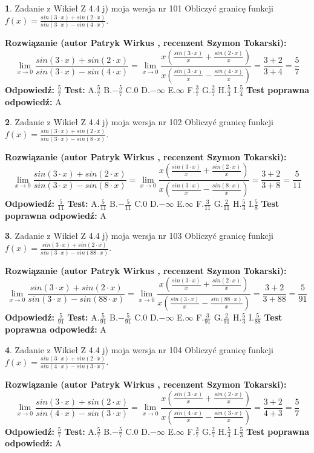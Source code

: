 \documentclass[12pt, a4paper]{article}
\theoremstyle{definition} %
\newtheorem{zad}{}
\newcommand{\zadStart}[1]{\begin{zad}#1\newline}
\newcommand{\zadStop}{\end{zad}}
\newcommand{\rozwStart}[2]{\noindent \textbf{Rozwiązanie (autor #1 , recenzent #2): }\newline}
\newcommand{\rozwStop}{\newline}
\newcommand{\odpStart}{\noindent \textbf{Odpowiedź:}\newline}
\newcommand{\odpStop}{\newline}
\newcommand{\testStart}{\noindent \textbf{Test:}\newline}
\newcommand{\testStop}{\newline}
\newcommand{\kluczStart}{\noindent \textbf{Test poprawna odpowiedź:}\newline}
\newcommand{\kluczStop}{\newline}
\begin{document}
\zadStart{Zadanie z Wikieł Z 4.4 j) moja wersja nr 101}
Obliczyć granicę funkcji $f(x)=\frac{sin(3\cdot x) +sin(2\cdot x)}{sin(3\cdot x) -sin(4\cdot x)}$.
\zadStop
\rozwStart{Patryk Wirkus}{Szymon Tokarski}
$$\lim\limits_{x\to 0}\frac{sin(3\cdot x) +sin(2\cdot x)}{sin(3\cdot x) -sin(4\cdot x)}=\lim\limits_{x\to 0}\frac{x(\frac{sin(3\cdot x)}{x}+\frac{sin(2\cdot x)}{x})}{x(\frac{sin(3\cdot x)}{x}-\frac{sin(4\cdot x)}{x})}=\frac{3+2}{3+4} = \frac{5}{7}$$
\rozwStop
\odpStart
$\frac{5}{7}$
\odpStop
\testStart
A.$\frac{5}{7}$
B.$-\frac{5}{7}$
C.$0$
D.$-\infty$
E.$\infty$
F.$\frac{3}{7}$
G.$\frac{2}{7}$
H.$\frac{5}{3}$
I.$\frac{5}{4}$
\testStop
\kluczStart
A
\kluczStop



\zadStart{Zadanie z Wikieł Z 4.4 j) moja wersja nr 102}
Obliczyć granicę funkcji $f(x)=\frac{sin(3\cdot x) +sin(2\cdot x)}{sin(3\cdot x) -sin(8\cdot x)}$.
\zadStop
\rozwStart{Patryk Wirkus}{Szymon Tokarski}
$$\lim\limits_{x\to 0}\frac{sin(3\cdot x) +sin(2\cdot x)}{sin(3\cdot x) -sin(8\cdot x)}=\lim\limits_{x\to 0}\frac{x(\frac{sin(3\cdot x)}{x}+\frac{sin(2\cdot x)}{x})}{x(\frac{sin(3\cdot x)}{x}-\frac{sin(8\cdot x)}{x})}=\frac{3+2}{3+8} = \frac{5}{11}$$
\rozwStop
\odpStart
$\frac{5}{11}$
\odpStop
\testStart
A.$\frac{5}{11}$
B.$-\frac{5}{11}$
C.$0$
D.$-\infty$
E.$\infty$
F.$\frac{3}{11}$
G.$\frac{2}{11}$
H.$\frac{5}{3}$
I.$\frac{5}{8}$
\testStop
\kluczStart
A
\kluczStop



\zadStart{Zadanie z Wikieł Z 4.4 j) moja wersja nr 103}
Obliczyć granicę funkcji $f(x)=\frac{sin(3\cdot x) +sin(2\cdot x)}{sin(3\cdot x) -sin(88\cdot x)}$.
\zadStop
\rozwStart{Patryk Wirkus}{Szymon Tokarski}
$$\lim\limits_{x\to 0}\frac{sin(3\cdot x) +sin(2\cdot x)}{sin(3\cdot x) -sin(88\cdot x)}=\lim\limits_{x\to 0}\frac{x(\frac{sin(3\cdot x)}{x}+\frac{sin(2\cdot x)}{x})}{x(\frac{sin(3\cdot x)}{x}-\frac{sin(88\cdot x)}{x})}=\frac{3+2}{3+88} = \frac{5}{91}$$
\rozwStop
\odpStart
$\frac{5}{91}$
\odpStop
\testStart
A.$\frac{5}{91}$
B.$-\frac{5}{91}$
C.$0$
D.$-\infty$
E.$\infty$
F.$\frac{3}{91}$
G.$\frac{2}{91}$
H.$\frac{5}{3}$
I.$\frac{5}{88}$
\testStop
\kluczStart
A
\kluczStop



\zadStart{Zadanie z Wikieł Z 4.4 j) moja wersja nr 104}
Obliczyć granicę funkcji $f(x)=\frac{sin(3\cdot x) +sin(2\cdot x)}{sin(4\cdot x) -sin(3\cdot x)}$.
\zadStop
\rozwStart{Patryk Wirkus}{Szymon Tokarski}
$$\lim\limits_{x\to 0}\frac{sin(3\cdot x) +sin(2\cdot x)}{sin(4\cdot x) -sin(3\cdot x)}=\lim\limits_{x\to 0}\frac{x(\frac{sin(3\cdot x)}{x}+\frac{sin(2\cdot x)}{x})}{x(\frac{sin(4\cdot x)}{x}-\frac{sin(3\cdot x)}{x})}=\frac{3+2}{4+3} = \frac{5}{7}$$
\rozwStop
\odpStart
$\frac{5}{7}$
\odpStop
\testStart
A.$\frac{5}{7}$
B.$-\frac{5}{7}$
C.$0$
D.$-\infty$
E.$\infty$
F.$\frac{3}{7}$
G.$\frac{2}{7}$
H.$\frac{5}{4}$
I.$\frac{5}{3}$
\testStop
\kluczStart
A
\kluczStop
\end{document}
